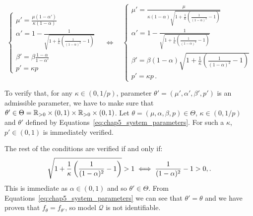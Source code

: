\begin{subappendices}
    \begin{equation}\label{eq:chap5_system_parameters}
        \begin{cases*}
            \mu' = \frac{\mu(1-\alpha')}{\kappa(1-\alpha)}\\
            \alpha' = 1 - \frac{1}{\sqrt{1 + \frac{1}{\kappa}\left(\frac{1}{(1-\alpha)^2} - 1\right)}}\\
            \beta' = \beta \frac{1-\alpha}{1-\alpha'}\\
            p' = \kappa p
        \end{cases*}
        \quad\iff\quad
        \begin{cases}
            \mu' = \frac{\mu}{\kappa(1-\alpha)\sqrt{1 + \frac{1}{\kappa}\left(\frac{1}{(1-\alpha)^2} - 1\right)}}\\
            \alpha' = 1 - \frac{1}{\sqrt{1 + \frac{1}{\kappa}\left(\frac{1}{(1-\alpha)^2} - 1\right)}}\\
            \beta' = \beta (1-\alpha) \sqrt{1 + \frac{1}{\kappa}\left(\frac{1}{(1-\alpha)^2} - 1\right)}\\
            p' = \kappa p\,.
        \end{cases}
    \end{equation}
    
    To verify that, for any $\kappa\in(0,1/p)$, parameter $\theta' = (\mu', \alpha', \beta', p')$ is an admissible parameter,
    we have to make sure that $\theta' \in \Theta = {\mathbb R}_{>0}\times (0,1) \times {\mathbb R}_{>0} \times (0,1)$.
    Let $\theta = (\mu, \alpha, \beta, p)\in\Theta$, $\kappa\in(0,1/p)$ and $\theta'$ defined by Equations~\eqref{eq:chap5_system_parameters}.
    For such a $\kappa$, $p'\in(0,1)$ is immediately verified.

    The rest of the conditions are verified if and only if: 
    \[\sqrt{1 + \frac{1}{\kappa}\left(\frac{1}{(1-\alpha)^2} - 1\right)} > 1 \iff \frac{1}{(1-\alpha)^2} - 1 > 0\\,.\]
    This is immediate as $\alpha\in(0,1)$ and so $\theta'\in\Theta$. 
    From Equations~\eqref{eq:chap5_system_parameters}
    we can see that $\theta'=\theta$ and we have proven that $f_\theta = f_{\theta'}$,
    so model $\mathcal{Q}$ is not identifiable.


\end{subappendices}
